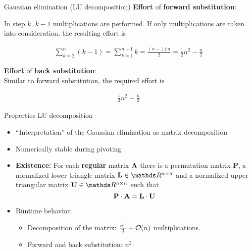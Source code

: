 \begin{vbframe}{Gaussian elimination (LU decomposition)}
\textbf{Effort} of \textbf{forward substitution}:\\

\medskip

In step $k$,  $k - 1$ multiplications are performed. If only multiplications are taken into consideration, the resulting effort is

\begin{eqnarray*}
\sum_{k=2}^{n} (k - 1) = \sum_{k=1}^{n - 1} k = \frac{(n- 1)n}{2} = \frac{1}{2}n^2 - \frac{n}{2}
\end{eqnarray*}

\lz

\textbf{Effort} of \textbf{back substitution}:\\
\medskip
Similar to forward substitution, the required effort is

\begin{eqnarray*}
\frac{1}{2}n^2 + \frac{n}{2}
\end{eqnarray*}

\framebreak


\end{vbframe}

\begin{vbframe} {Properties LU decomposition}

\begin{itemize}
\item \enquote{Interpretation} of the Gaussian elimination as matrix decomposition
\item Numerically stable during pivoting
\item \textbf{Existence:} For each \textbf{regular} matrix $\mathbf{A}$ there is a permutation matrix $\mathbf{P}$, a normalized lower triangle matrix $\mathbf{L} \in \R^{n \times n}$ and a normalized upper triangular matrix $\mathbf{U} \in \R^{n \times n}$ such that 
$$
\mathbf{P} \cdot \mathbf{A} = \mathbf{L} \cdot \mathbf{U}
$$
\item Runtime behavior:
\begin{itemize}
\item Decomposition of the matrix: $\frac{n^3}{3} + \mathcal{O}(n)$ multiplications. 
\item Forward and back substitution: $n^2$
\end{itemize}
\end{itemize}





\end{vbframe}


\endlecture








